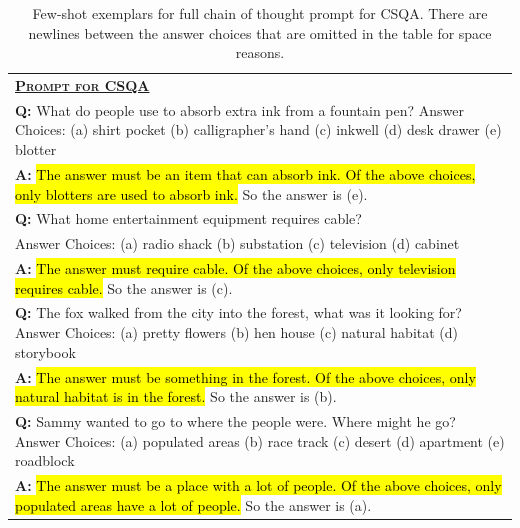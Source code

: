 \begingroup
\begin{table}[H]
    \caption{    
    Few-shot exemplars for full chain of thought prompt for CSQA. There are newlines between the answer choices that are omitted in the table for space reasons.
    }
    \centering
    \small
    \begin{tabular}{p{\linewidth}}
        \toprule
        \underline{\textbf{\textsc{Prompt for CSQA}}} \\
        \vspace{-2mm}
        \textbf{Q:} What do people use to absorb extra ink from a fountain pen? Answer Choices: (a) shirt pocket (b) calligrapher's hand (c) inkwell (d) desk drawer (e) blotter \\
        \vspace{-1mm}
        \textbf{A:} \hl{The answer must be an item that can absorb ink. Of the above choices, only blotters are used to absorb ink.} So the answer is (e). \\
        \vspace{0mm}
        \textbf{Q:} What home entertainment equipment requires cable? \\
        Answer Choices: (a) radio shack (b) substation (c) television (d) cabinet \\
        \vspace{-1mm}
        \textbf{A:} \hl{The answer must require cable. Of the above choices, only television requires cable.} So the answer is (c). \\
        \vspace{0mm}
        \textbf{Q:} The fox walked from the city into the forest, what was it looking for? Answer Choices: (a) pretty flowers (b) hen house (c) natural habitat (d) storybook\\
        \vspace{-1mm}
        \textbf{A:} \hl{The answer must be something in the forest. Of the above choices, only natural habitat is in the forest.}  So the answer is (b). \\
        \vspace{0mm}
        \textbf{Q:} Sammy wanted to go to where the people were. Where might he go? Answer Choices: (a) populated areas (b) race track (c) desert (d) apartment (e) roadblock \\
        \vspace{-1mm}
        \textbf{A:} \hl{The answer must be a place with a lot of people. Of the above choices, only populated areas have a lot of people.} So the answer is (a). \\

\end{tabular}
\end{table}
